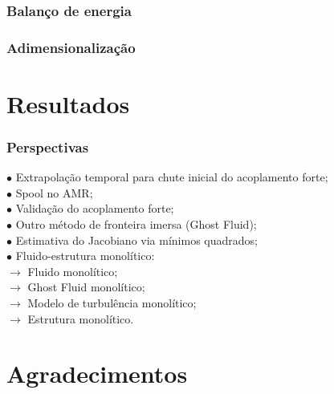 \documentclass[xcolor=dvipsnames,10pt,aspectratio=169]{beamer}
\begin{document}
	
	
	
	
		\begin{frame}
			\frametitle{Balanço de energia}
		\end{frame}
	
	
	
	
	
		\begin{frame}
			\frametitle{Adimensionalização}
		\end{frame}
	


		
		
	\section{Resultados}
		
		


		\begin{frame}
			\frametitle{Perspectivas}
			$\bullet$ Extrapolação temporal para chute inicial do acoplamento forte;\\
			$\bullet$ Spool no AMR;\\
			$\bullet$ Validação do acoplamento forte;\\
			$\bullet$ Outro método de fronteira imersa (Ghost Fluid);\\
			$\bullet$ Estimativa do Jacobiano via mínimos quadrados;\\
			$\bullet$ Fluido-estrutura monolítico:\\
			$\longrightarrow$ Fluido monolítico;\\
			$\longrightarrow$ Ghost Fluid monolítico;\\
			$\longrightarrow$ Modelo de turbulência monolítico;\\
			$\longrightarrow$ Estrutura monolítico.\\
		\end{frame}	
	
	
	
	
	
	
	
	\section{Agradecimentos}
		
		
		
		
		
\end{document}
